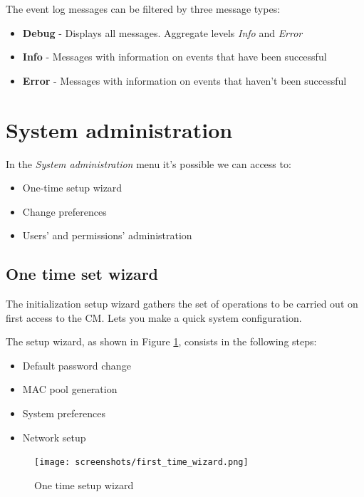The event log messages can be filtered by three message types:
\begin{itemize}
    \item {\bf Debug} - Displays all messages. Aggregate levels \emph{Info} and \emph{Error}
    \item {\bf Info} - Messages with information on events that have been successful
    \item {\bf Error} - Messages with information on events that haven't been successful
\end{itemize}

\section{System administration}
\label{sec:first_time_wizard}
In the \emph{System administration} menu it's possible we can access to:
\begin{itemize}
\item One-time setup wizard
\item Change preferences
\item Users' and permissions' administration
\end{itemize}

\subsection{One time set wizard}
The initialization setup wizard gathers the set of operations to be carried out on first access to the CM. Lets you make a quick system configuration.

The setup wizard, as shown in Figure \ref{fig:first_time_wizard}, consists in the following steps:

\begin{itemize}
	\item Default password change
	\item MAC pool generation
    \item System preferences
	\item Network setup
\end{itemize}

\begin{figure}[H]
        \begin{center}
        \texttt{[image: screenshots/first\_time\_wizard.png]}
        \caption{One time setup wizard}
        \label{fig:first_time_wizard}
        \end{center}
\end{figure}

